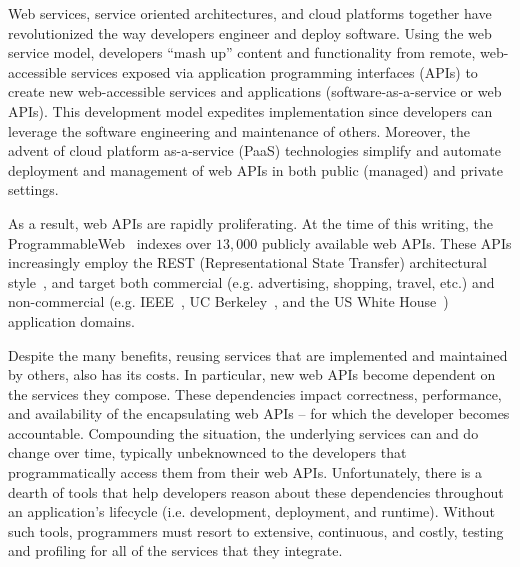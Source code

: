 Web services, service oriented architectures, and cloud platforms together have
revolutionized the way developers engineer and deploy software.
Using the web service model, developers ``mash up'' content and functionality 
from remote, web-accessible services exposed via application programming interfaces (APIs)
to create new web-accessible services and applications (software-as-a-service or web APIs).  
This development model expedites implementation since developers can leverage the 
software engineering and maintenance of others.
Moreover, the advent of cloud platform as-a-service (PaaS) technologies 
simplify and automate deployment and management
of web APIs in both public (managed) and private settings.  

As a result, web APIs are rapidly 
proliferating.  At the time of this writing, 
the ProgrammableWeb~\cite{pweb} indexes over $13,000$
publicly available web APIs.
These APIs increasingly employ the REST (Representational State Transfer) 
architectural style~\cite{Fielding:2000:ASD:932295}, and target both
commercial (e.g. advertising, shopping, travel, etc.) and non-commercial
(e.g. IEEE~\cite{ieeeapis}, UC Berkeley~\cite{ucbapis}, and the US White
House~\cite{whitehouseapis}) application domains.

Despite the many benefits, reusing services that are implemented
and maintained by others, also has its costs.  
In particular, new web APIs become dependent on the 
services they compose.  These dependencies
impact correctness, performance, and availability of the encapsulating 
web APIs -- for which the developer becomes accountable.  
Compounding the situation, the underlying services can and do change over time, typically
unbeknownced to the developers that programmatically access them from their web APIs.
Unfortunately, there is a dearth of tools that help developers reason about these 
dependencies throughout an application's 
lifecycle (i.e. development, deployment, and runtime).  Without such tools, 
programmers must resort to extensive, continuous, and costly, testing and profiling 
for all of the services that they integrate.

